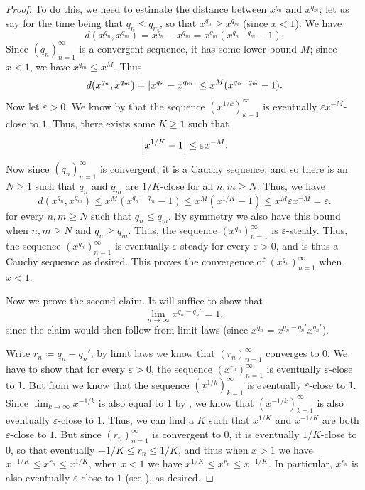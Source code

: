 \begin{proof}
  To do this, we need to estimate the distance between \(x^{q_n}\) and \(x^{q_m}\);
  let us say for the time being that \(q_n \leq q_m\), so that \(x^{q_n} \geq x^{q_m}\) (since \(x < 1\)).
  We have
  \[
    d(x^{q_n}, x^{q_m}) = x^{q_n} - x^{q_m} = x^{q_m} (x^{q_n - q_m} - 1).
  \]
  Since \((q_n)_{n = 1}^\infty\) is a convergent sequence, it has some lower bound \(M\);
  since \(x < 1\), we have \(x^{q_m} \leq x^M\).
  Thus
  \[
    d(x^{q_n}, x^{q_m}) = \left\lvert x^{q_n} - x^{q_m}\right\rvert \leq x^M (x^{q_n - q_m} - 1).
  \]
  Now let \(\varepsilon > 0\).
  We know by  that the sequence \((x^{1 / k})_{k = 1}^\infty\) is eventually \(\varepsilon x^{-M}\)-close to \(1\).
  Thus, there exists some \(K \geq 1\) such that
  \[
    \left\lvert x^{1 / K} - 1\right\rvert \leq \varepsilon x^{-M}.
  \]
  Now since \((q_n)_{n = 1}^\infty\) is convergent, it is a Cauchy sequence, and so there is an \(N \geq 1\) such that \(q_n\) and \(q_m\) are \(1 / K\)-close for all \(n, m \geq N\).
  Thus, we have
  \[
    d(x^{q_n}, x^{q_m}) \leq x^M (x^{q_n - q_m} - 1) \leq x^M (x^{1 / K} - 1) \leq x^M \varepsilon x^{-M} = \varepsilon.
  \]
  for every \(n, m \geq N\) such that \(q_n \leq q_m\).
  By symmetry we also have this bound when \(n, m \geq N\) and \(q_n \geq q_m\).
  Thus, the sequence \((x^{q_n})_{n = 1}^\infty\) is \(\varepsilon\)-steady.
  Thus, the sequence \((x^{q_n})_{n = 1}^\infty\) is eventually \(\varepsilon\)-steady for every \(\varepsilon > 0\), and is thus a Cauchy sequence as desired.
  This proves the convergence of \((x^{q_n})_{n = 1}^\infty\) when \(x < 1\).

  Now we prove the second claim.
  It will suffice to show that
  \[
    \lim_{n \to \infty} x^{q_n - q_n'} = 1,
  \]
  since the claim would then follow from limit laws
  (since \(x^{q_n} = x^{q_n - q_n'} x^{q_n'}\)).

  Write \(r_n \coloneqq q_n - q_n'\);
  by limit laws we know that \((r_n)_{n = 1}^\infty\) converges to \(0\).
  We have to show that for every \(\varepsilon > 0\), the sequence \((x^{r_n})_{n = 1}^\infty\) is eventually \(\varepsilon\)-close to \(1\).
  But from  we know that the sequence \((x^{1 / k})_{k = 1}^\infty\) is eventually \(\varepsilon\)-close to \(1\).
  Since \(\lim_{k \to \infty} x^{-1 / k}\) is also equal to \(1\) by , we know that \((x^{-1 / k})_{k = 1}^\infty\) is also eventually \(\varepsilon\)-close to \(1\).
  Thus, we can find a \(K\) such that \(x^{1 / K}\) and \(x^{-1 / K}\) are both \(\varepsilon\)-close to \(1\).
  But since \((r_n)_{n = 1}^\infty\) is convergent to \(0\), it is eventually \(1 / K\)-close to \(0\), so that eventually \(-1 / K \leq r_n \leq 1 / K\), and thus when \(x > 1\) we have \(x^{-1 / K} \leq x^{r_n} \leq x^{1 / K}\), when \(x < 1\) we have \(x^{1 / K} \leq x^{r_n} \leq x^{-1 / K}\).
  In particular, \(x^{r_n}\) is also eventually \(\varepsilon\)-close to \(1\) (see ), as desired.
\end{proof}

